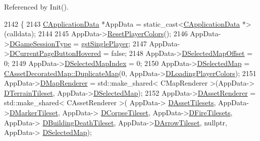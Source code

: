 Referenced by Init().


\begin{DoxyCode}
2142                                                                    \{
2143     \hyperlink{classCApplicationData}{CApplicationData} *AppData = \textcolor{keyword}{static\_cast<}\hyperlink{classCApplicationData}{CApplicationData} *\textcolor{keyword}{>}(calldata);
2144 
2145     AppData->\hyperlink{classCApplicationData_a46653e8a3ed079f3921ec0257e49eb89}{ResetPlayerColors}();
2146     AppData->\hyperlink{classCApplicationData_acd2cc6f5bbb325532c21afc38241c3de}{DGameSessionType} = \hyperlink{classCApplicationData_a0ec00515bf6b4b469b43ad62d615e3faa5e3d4c6876a2985f22eb59c373bc9e1d}{gstSinglePlayer};
2147     AppData->\hyperlink{classCApplicationData_a96b3a9b5c9965540007dff3fa85587fa}{DCurrentPageButtonHovered} = \textcolor{keyword}{false};
2148     AppData->\hyperlink{classCApplicationData_a443edd0c2c7964fc51a82bf2a016725b}{DSelectedMapOffset} = 0;
2149     AppData->\hyperlink{classCApplicationData_a279cfd90004e3f1b90b119358ff25586}{DSelectedMapIndex} = 0;                                        
2150     AppData->\hyperlink{classCApplicationData_abf74a18394e479b7090a8f9a55608867}{DSelectedMap} = \hyperlink{classCAssetDecoratedMap_a9d0fa2b32e4e8add6da83a7ebcfab6d8}{CAssetDecoratedMap::DuplicateMap}(0,
      AppData->\hyperlink{classCApplicationData_ab29b80d90f1201608dcb498cd627a6f9}{DLoadingPlayerColors});
2151     AppData->\hyperlink{classCApplicationData_afaf62b458bd7a0ec93ab9f063d7ea8d7}{DMapRenderer} = std::make\_shared< CMapRenderer >(AppData->
      \hyperlink{classCApplicationData_acd9fb0d0ea35a6d93e8ec9212db8ef83}{DTerrainTileset}, AppData->\hyperlink{classCApplicationData_abf74a18394e479b7090a8f9a55608867}{DSelectedMap}); 
2152     AppData->\hyperlink{classCApplicationData_a5b42401441ae3a70fb4bd26f5dfdba01}{DAssetRenderer} = std::make\_shared< CAssetRenderer >( AppData->
      \hyperlink{classCApplicationData_a1aaf56a300b30c5e2484a5359366d77a}{DAssetTilesets}, AppData->\hyperlink{classCApplicationData_ae9f336696b810bff2353d731300ec9d7}{DMarkerTileset}, AppData->
      \hyperlink{classCApplicationData_aec983aa995cdb449344422d607fe0228}{DCorpseTileset}, AppData->\hyperlink{classCApplicationData_a68f7be36ab8b46ea7fca3bd3e79784cd}{DFireTilesets}, AppData->
      \hyperlink{classCApplicationData_ab463f816076fec8d43ecfe61120e8e6b}{DBuildingDeathTileset}, AppData->\hyperlink{classCApplicationData_a5c617fcea02a399ecffee313eead2159}{DArrowTileset}, \textcolor{keyword}{nullptr}, AppData->
      \hyperlink{classCApplicationData_abf74a18394e479b7090a8f9a55608867}{DSelectedMap});

\end{DoxyCode}
